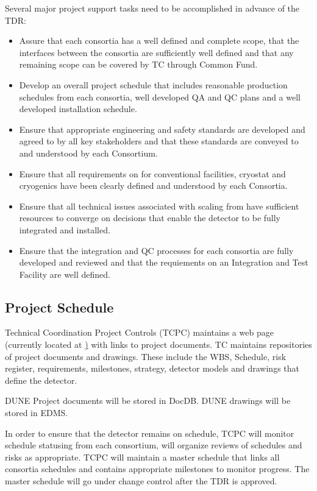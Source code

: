 Several major project support tasks need to be accomplished in advance
of the TDR:
\begin{itemize}
  \item Assure that each consortia has a well defined
and complete scope, that the interfaces between the consortia are
sufficiently well defined and that any remaining scope can be covered
by TC through Common Fund.
  \item Develop an overall project schedule that includes reasonable
production schedules from each consortia, well developed QA and QC
plans and a well developed installation schedule.
  \item Ensure that appropriate engineering and safety standards are
developed and agreed to by all key stakeholders and that these
standards are conveyed to and understood by each Consortium.
  \item Ensure that all  requirements on  for
conventional facilities, cryostat and cryogenics have been clearly
defined and understood by each Consortia.
  \item Ensure that all technical issues associated with scaling from
 have sufficient resources to converge on decisions that
enable the detector to be fully integrated and installed.
  \item Ensure that the integration and QC processes for each
consortia are fully developed and reviewed and that the requiements on
an Integration and Test Facility are well defined.
\end{itemize}

\subsection{Project Schedule}
\label{sec:fdsp-coord-controls}

Technical Coordination Project Controls (TCPC) maintains a web page
(currently located at
\href{https://web.fnal.gov/collaboration/DUNE/DUNE\%20Project/\_layouts/15/start.aspx\#/})
with links to project documents. TC maintains repositories of project
documents and drawings. These include the WBS, Schedule, risk
register, requirements, milestones, strategy, detector models and
drawings that define the  detector.

DUNE Project documents will be stored in DocDB. DUNE drawings will be stored in EDMS.

In order to ensure that the  detector remains on schedule, TCPC
will monitor schedule statusing from each consortium, will organize
reviews of schedules and risks as appropriate. TCPC will maintain a
master schedule that links all consortia schedules and contains
appropriate milestones to monitor progress. The master schedule will
go under change control after the TDR is approved.

